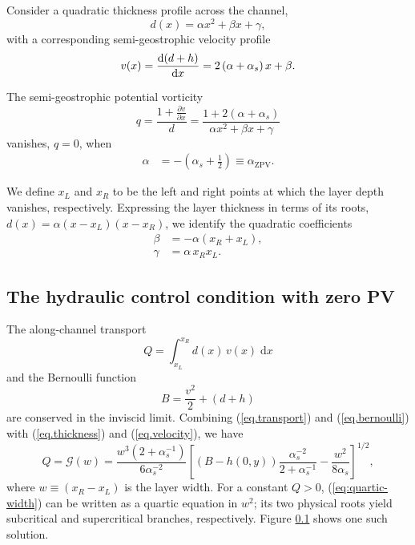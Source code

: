 \documentclass{jfm}
\begin{document}
Consider a quadratic thickness profile across the channel,
\begin{equation}\label{eq.thickness}
d(x) = \alpha x^{2} + \beta x + \gamma,
\end{equation}
with a corresponding semi-geostrophic velocity profile
\begin{equation}\label{eq.velocity}
v(x) = \dv{(d+h)}{x} = 2\left( \alpha + \alpha_{s} \right) x + \beta.
\end{equation}

The semi-geostrophic potential vorticity 
\begin{equation}
q = \frac{1+\frac{\partial v}{\partial x}}{d} = \frac{1+2(\alpha + \alpha_{s})}{\alpha x^{2} + \beta x + \gamma}
\end{equation}
vanishes, $q=0$, when 
\begin{align}
\alpha &= - \left(\alpha_{s} + \frac{1}{2} \right) \equiv \alpha_{\text{ZPV}}.
\end{align}

We define $x_{L}$ and $x_{R}$ to be the left and right points at which the layer depth vanishes, respectively. Expressing the layer thickness in terms of its roots, $d(x) = \alpha (x-x_{L})(x-x_{R})$, we identify the quadratic coefficients
\begin{align}
\beta &= -\alpha(x_{R}+x_{L}), \\
\gamma &= \alpha\, x_{R}x_{L}.
\end{align}

\subsection{The hydraulic control condition with zero PV}

The along-channel transport 
\begin{equation}\label{eq.transport}
Q = \int_{x_{L}}^{x_{R}} d(x)\, v(x)\; \text{d}x
\end{equation}
and the Bernoulli function
\begin{equation}\label{eq.bernoulli}
B = \frac{v^{2}}{2} + (d + h)
\end{equation}
are conserved in the inviscid limit. Combining (\ref{eq.transport}) and (\ref{eq.bernoulli}) with (\ref{eq.thickness}) and (\ref{eq.velocity}), we have
\begin{equation}
    Q = \mathcal{G}(w) = \frac{w^{3} (2+\alpha_{s}^{-1})}{6\alpha_{s}^{-2}} \left[ (B - h(0, y)) \frac{  \alpha_{s}^{-2}}{2+\alpha_{s}^{-1}} - \frac{w^{2}}{8\alpha_{s}} \right]^{1/2}\label{eq:quartic-width},
\end{equation}
where $w \equiv (x_{R} - x_{L})$ is the layer width. For a constant $Q>0$, (\ref{eq:quartic-width}) can be written as a quartic equation in $w^{2}$; its two physical roots yield subcritical and supercritical branches, respectively. Figure \ref{} shows one such solution.
\end{document}
